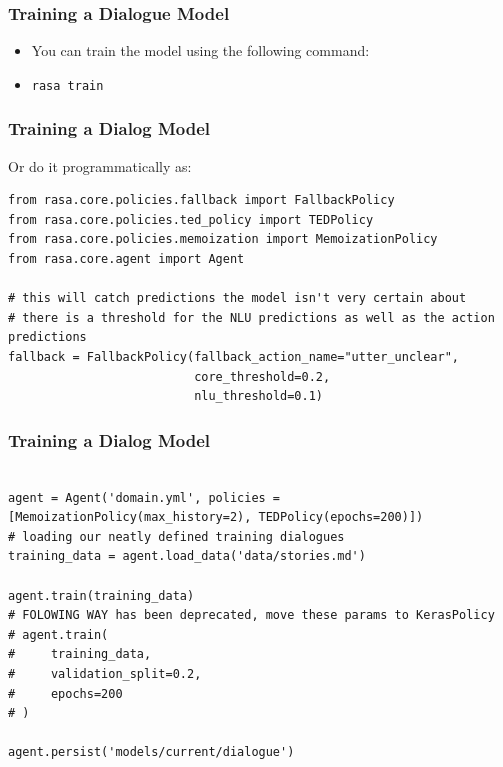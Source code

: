  \begin{frame}[fragile]\frametitle{Training a Dialogue Model}


\begin{itemize}
\item You can train the model using the following command:

\item \lstinline|rasa train|
\end{itemize}

\end{frame}

 \begin{frame}[fragile]\frametitle{Training a Dialog Model}

Or do it programmatically as:

\begin{lstlisting}
from rasa.core.policies.fallback import FallbackPolicy
from rasa.core.policies.ted_policy import TEDPolicy
from rasa.core.policies.memoization import MemoizationPolicy
from rasa.core.agent import Agent

# this will catch predictions the model isn't very certain about
# there is a threshold for the NLU predictions as well as the action predictions
fallback = FallbackPolicy(fallback_action_name="utter_unclear",
                          core_threshold=0.2,
                          nlu_threshold=0.1)

\end{lstlisting}

\end{frame}

 \begin{frame}[fragile]\frametitle{Training a Dialog Model}

\begin{lstlisting}

agent = Agent('domain.yml', policies = [MemoizationPolicy(max_history=2), TEDPolicy(epochs=200)])
# loading our neatly defined training dialogues
training_data = agent.load_data('data/stories.md')

agent.train(training_data)
# FOLOWING WAY has been deprecated, move these params to KerasPolicy
# agent.train(
#     training_data,
#     validation_split=0.2,
#     epochs=200
# )

agent.persist('models/current/dialogue')
\end{lstlisting}

\end{frame}

